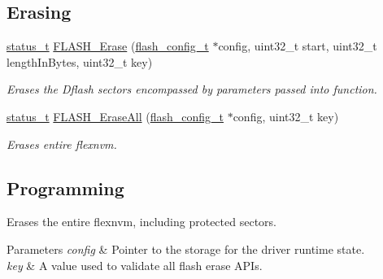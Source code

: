 \subsection*{Erasing}
\begin{DoxyCompactItemize}
\item 
\mbox{\hyperlink{group__ksdk__common_gaaabdaf7ee58ca7269bd4bf24efcde092}{status\+\_\+t}} \mbox{\hyperlink{group__ftfx__flash__driver_gae9cb58f4cf76fec37631c4f344e2fb10}{F\+L\+A\+S\+H\+\_\+\+Erase}} (\mbox{\hyperlink{group__ftfx__flash__driver_ga0dfc969e6f9e17c17e60d823565141a5}{flash\+\_\+config\+\_\+t}} $\ast$config, uint32\+\_\+t start, uint32\+\_\+t length\+In\+Bytes, uint32\+\_\+t key)
\begin{DoxyCompactList}\small\item\em Erases the Dflash sectors encompassed by parameters passed into function. \end{DoxyCompactList}\item 
\mbox{\hyperlink{group__ksdk__common_gaaabdaf7ee58ca7269bd4bf24efcde092}{status\+\_\+t}} \mbox{\hyperlink{group__ftfx__flash__driver_ga620aad3b28de9e89e3297bd1bbcd5618}{F\+L\+A\+S\+H\+\_\+\+Erase\+All}} (\mbox{\hyperlink{group__ftfx__flash__driver_ga0dfc969e6f9e17c17e60d823565141a5}{flash\+\_\+config\+\_\+t}} $\ast$config, uint32\+\_\+t key)
\begin{DoxyCompactList}\small\item\em Erases entire flexnvm. \end{DoxyCompactList}\end{DoxyCompactItemize}
\subsection*{Programming}
\label{_amgrpe6f43c40ab1c07cd29e4e83e4ef6bf85}%
Erases the entire flexnvm, including protected sectors.


\begin{DoxyParams}{Parameters}
{\em config} & Pointer to the storage for the driver runtime state. \\
\hline
{\em key} & A value used to validate all flash erase A\+P\+Is.\\
\hline
\end{DoxyParams}

